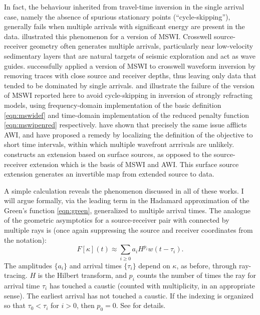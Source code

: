In fact, the behaviour inherited from travel-time inversion in the
single arrival case, namely the absence of spurious stationary points
(``cycle-skipping''), generally fails when multiple arrivals with
significant energy are present in the data. \cite{Symes:94c}
illustrated this phenomenon for a version of MSWI. Crosswell
source-receiver geometry often generates multiple arrivals,
particularly near low-velocity sedimentary layers that are natural
targets of seismic exploration and act as wave
guides. \cite{Plessix:00} successfully applied a version of MSWI to
crosswell waveform inversion by removing traces with close source and
receiver depths, thus leaving only data that tended to be dominated by
single arrivals. \cite{HuangSymes:Geo17} and
\cite{SymesChenMinkoff:24} illustrate the failure of the
version of MSWI reported here to avoid cycle-skipping in inversion of
strongly refracting models, using frequency-domain implementation of
the basic definition \ref{eqn:mswidef} and time-domain implementation
of the reduced penalty function \ref{eqn:mswipenred} respectively. \cite{Yongetal:GJI23}
have shown that precisely the same issue afflicts AWI, and have
proposed a remedy by localizing the definition of the objective to
short time intervals, within which multiple wavefront arrrivals are
unlikely. \cite{Symes:23} constructs an extension based on surface
sources, as opposed to the source-receiver extension which is the
basis of MSWI and AWI. This surface source extension generates an
invertible map from extended source to data.

A simple calculation reveals the phenomenon discussed in all of these
works. I will argue formally, via the leading term in the Hadamard
approximation of the Green's function \ref{eqn:green}, generalized to
multiple arrival times. The analogue of the geometric asymptotics for a source-receiver
pair with connected by multiple rays is (once again suppressing the
source and receiver coordinates from the notation):
\begin{equation}
  \label{eqn:multi}
  F[\kappa](t) \approx \sum_{i \ge 0} a_i H^{p_i}w(t-\tau_i).
\end{equation}
The amplitudes $\{a_i\}$ and arrival times $\{\tau_i\}$ depend on $\kappa$, as
before, through ray-tracing. $H$ is the Hilbert transform, and $p_i$
counts the number of times the ray for arrival time $\tau_i$ has
touched a caustic (counted with multiplicity, in an appropriate
sense). The earliest arrival has not touched a caustic. If the
indexing is organized so that $\tau_0 < \tau_i$ for $i>0$, then
$p_0=0$. See \cite{Friedlander:75} for details.

